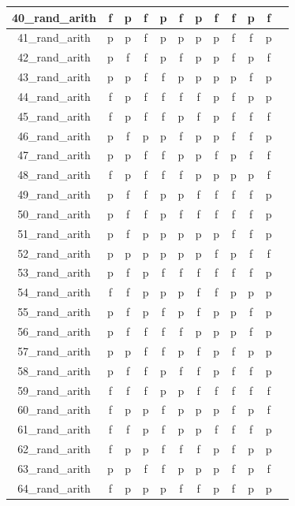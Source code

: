 \documentclass[
fancyheadings, %
%
%
]{stsreprt}
\begin{document}
\begin{longtable}{|c|c|c|c|c|c|c|c|c|c|c|c|}
\hline
40\_rand\_arith & f & p & f & p & f & p & f & f & p & f \\
\hline
41\_rand\_arith & p & p & f & p & p & p & p & f & f & p \\
\hline
42\_rand\_arith & p & f & f & p & f & p & p & f & p & f \\
\hline
43\_rand\_arith & p & p & f & f & p & p & p & p & f & p \\
\hline
44\_rand\_arith & f & p & f & f & f & f & p & f & p & p \\
\hline
45\_rand\_arith & f & p & f & f & p & f & p & f & f & f \\
\hline
46\_rand\_arith & p & f & p & p & f & p & p & f & f & p \\
\hline
47\_rand\_arith & p & p & f & f & p & p & f & p & f & f \\
\hline
48\_rand\_arith & f & p & f & f & f & p & p & p & p & f \\
\hline
49\_rand\_arith & p & f & f & p & p & f & f & f & f & p \\
\hline
50\_rand\_arith & p & f & f & p & f & f & f & f & f & p \\
\hline
51\_rand\_arith & p & f & p & p & p & p & p & f & f & p \\
\hline
52\_rand\_arith & p & p & p & p & p & p & f & p & f & f \\
\hline
53\_rand\_arith & p & f & p & f & f & f & f & f & f & p \\
\hline
54\_rand\_arith & f & f & p & p & p & f & f & p & p & p \\
\hline
55\_rand\_arith & p & f & p & f & p & f & p & p & f & p \\
\hline
56\_rand\_arith & p & f & f & f & f & p & p & p & f & p \\
\hline
57\_rand\_arith & p & p & f & f & p & f & p & f & p & p \\
\hline
58\_rand\_arith & p & f & f & p & f & f & p & f & f & p \\
\hline
59\_rand\_arith & f & f & f & p & p & f & f & f & f & f \\
\hline
60\_rand\_arith & f & p & p & f & p & p & p & f & p & f \\
\hline
61\_rand\_arith & f & f & p & f & p & p & f & f & f & p \\
\hline
62\_rand\_arith & f & p & p & f & f & f & p & f & p & p \\
\hline
63\_rand\_arith & p & p & f & f & p & p & p & f & p & f \\
\hline
64\_rand\_arith & f & p & p & p & f & f & p & f & p & p \\

\end{longtable}
\end{document}
